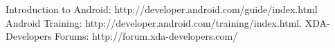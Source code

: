 \begin{thebibliography}{3}
\bibitem{} Introduction to Android: http://developer.android.com/guide/index.html
\bibitem{} Android Training: http://developer.android.com/training/index.html.
\bibitem{} XDA-Developers Forums: http://forum.xda-developers.com/
\end{thebibliography}